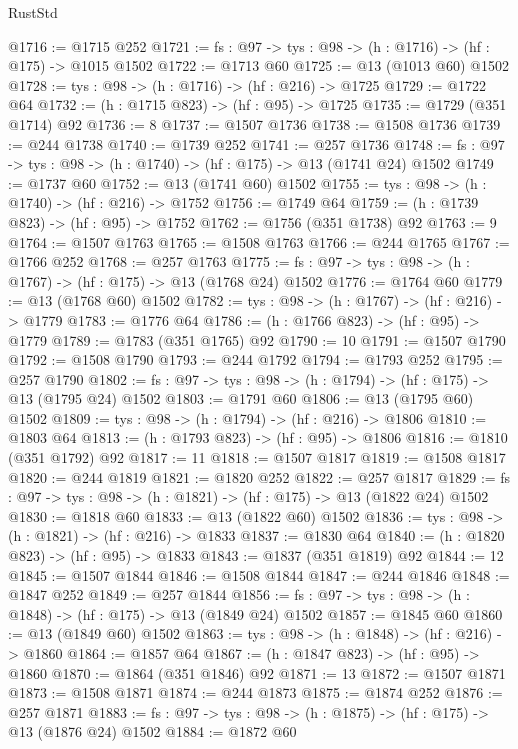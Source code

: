 \begin{lexlean}{RustStd}
\begin{coremodule}
@1716 := @1715 @252
@1721 := {fs : @97} -> {tys : @98} -> (h : @1716) -> (hf : @175) -> @1015 @1502
@1722 := @1713 @60
@1725 := @13 (@1013 @60) @1502
@1728 := {tys : @98} -> (h : @1716) -> (hf : @216) -> @1725
@1729 := @1722 @64
@1732 := (h : @1715 @823) -> (hf : @95) -> @1725
@1735 := @1729 (@351 @1714) @92
@1736 := 8
@1737 := @1507 @1736
@1738 := @1508 @1736
@1739 := @244 @1738
@1740 := @1739 @252
@1741 := @257 @1736
@1748 := {fs : @97} -> {tys : @98} -> (h : @1740) -> (hf : @175) -> @13 (@1741 @24) @1502
@1749 := @1737 @60
@1752 := @13 (@1741 @60) @1502
@1755 := {tys : @98} -> (h : @1740) -> (hf : @216) -> @1752
@1756 := @1749 @64
@1759 := (h : @1739 @823) -> (hf : @95) -> @1752
@1762 := @1756 (@351 @1738) @92
@1763 := 9
@1764 := @1507 @1763
@1765 := @1508 @1763
@1766 := @244 @1765
@1767 := @1766 @252
@1768 := @257 @1763
@1775 := {fs : @97} -> {tys : @98} -> (h : @1767) -> (hf : @175) -> @13 (@1768 @24) @1502
@1776 := @1764 @60
@1779 := @13 (@1768 @60) @1502
@1782 := {tys : @98} -> (h : @1767) -> (hf : @216) -> @1779
@1783 := @1776 @64
@1786 := (h : @1766 @823) -> (hf : @95) -> @1779
@1789 := @1783 (@351 @1765) @92
@1790 := 10
@1791 := @1507 @1790
@1792 := @1508 @1790
@1793 := @244 @1792
@1794 := @1793 @252
@1795 := @257 @1790
@1802 := {fs : @97} -> {tys : @98} -> (h : @1794) -> (hf : @175) -> @13 (@1795 @24) @1502
@1803 := @1791 @60
@1806 := @13 (@1795 @60) @1502
@1809 := {tys : @98} -> (h : @1794) -> (hf : @216) -> @1806
@1810 := @1803 @64
@1813 := (h : @1793 @823) -> (hf : @95) -> @1806
@1816 := @1810 (@351 @1792) @92
@1817 := 11
@1818 := @1507 @1817
@1819 := @1508 @1817
@1820 := @244 @1819
@1821 := @1820 @252
@1822 := @257 @1817
@1829 := {fs : @97} -> {tys : @98} -> (h : @1821) -> (hf : @175) -> @13 (@1822 @24) @1502
@1830 := @1818 @60
@1833 := @13 (@1822 @60) @1502
@1836 := {tys : @98} -> (h : @1821) -> (hf : @216) -> @1833
@1837 := @1830 @64
@1840 := (h : @1820 @823) -> (hf : @95) -> @1833
@1843 := @1837 (@351 @1819) @92
@1844 := 12
@1845 := @1507 @1844
@1846 := @1508 @1844
@1847 := @244 @1846
@1848 := @1847 @252
@1849 := @257 @1844
@1856 := {fs : @97} -> {tys : @98} -> (h : @1848) -> (hf : @175) -> @13 (@1849 @24) @1502
@1857 := @1845 @60
@1860 := @13 (@1849 @60) @1502
@1863 := {tys : @98} -> (h : @1848) -> (hf : @216) -> @1860
@1864 := @1857 @64
@1867 := (h : @1847 @823) -> (hf : @95) -> @1860
@1870 := @1864 (@351 @1846) @92
@1871 := 13
@1872 := @1507 @1871
@1873 := @1508 @1871
@1874 := @244 @1873
@1875 := @1874 @252
@1876 := @257 @1871
@1883 := {fs : @97} -> {tys : @98} -> (h : @1875) -> (hf : @175) -> @13 (@1876 @24) @1502
@1884 := @1872 @60

\end{coremodule}
\end{lexlean}
